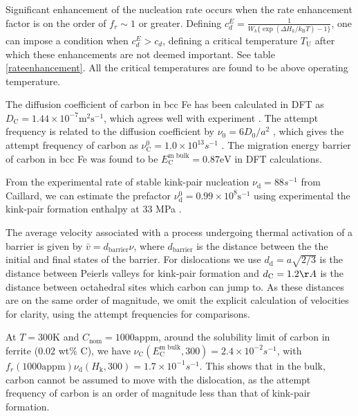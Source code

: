 \documentclass[a4paper,11pt]{article}
\numberwithin{equation}{chapter}
\numberwithin{listing}{chapter}
\begin{document}
Significant enhancement of the nucleation rate occurs when the rate enhancement factor
is on the order of \(f_r \sim 1\) or greater. Defining \(c_d^E = \frac{1}{W_k \{\exp(
   \Delta H_{k}/k_{\text{B}}T ) - 1 \}}\), one can impose a condition when \(c_d^E > c_d\),
defining a critical temperature \(T_{\text{U}}\) after which these enhancements are not
deemed important. See table \ref{rateenhancement}. All the critical temperatures
are found to be above operating temperature.





The diffusion coefficient of carbon in bcc Fe has been calculated in DFT as
\(D_{\text{C}} = 1.44 \times10^{-7} \text{m}^2\text{s}^{-1}\), which agrees well with
experiment \cite{Jiang2003,daSilva1976}. The attempt frequency is related to the
diffusion coefficient by \(\nu_0 = 6D_0 / a^2\) \cite{Ramasubramaniam2008}, which gives
the attempt frequency of carbon as \(\nu_{\text{C}}^0 = 1.0 \times10^{13} s^{-1}\)
\cite{Nematollahi2016}. The migration energy barrier of carbon in bcc Fe was found to be
\(E^{\text{m bulk}}_{\text{C}} = 0.87 \text{eV}\) in DFT calculations.

From the experimental rate of stable kink-pair nucleation \(\nu_{\text{d}} = 88 s^{-1}\)
from Caillard, we can estimate the prefactor \(\nu_{\text{d}}^0 = 0.99 \times
   10^8\text{s}^{-1}\) using experimental the kink-pair formation enthalpy at 33 MPa
\cite{itakura13_effec_hydrog_atoms_screw_disloc}.

The average velocity associated with a process undergoing thermal activation of a
barrier is given by \(\bar{v} = d_{\text{barrier}}\nu\), where \(d_{\text{barrier}}\) is
the distance between the the initial and final states of the barrier. For dislocations
we use \(d_{\text{d}} = a\sqrt{2/3}\) is the distance between Peierls valleys for
kink-pair formation and \(d_{\text{C}} = 1.2\AA\) is the distance between octahedral
sites which carbon can jump to. As these distances are on the same order of magnitude,
we omit the explicit calculation of velocities for clarity, using the attempt frequencies for comparisons.

At \(T=300 \text{K}\) and \(C_{\text{nom}} = 1000 \text{appm}\), around the solubility
limit of carbon in ferrite (0.02 wt\% C), we have \(\nu_{\text{C}}(E^{\text{m
   bulk}}_{\text{C}},300) = 2.4\times 10^{-2} s^{-1}\), with \(f_r(1000
   \text{appm})\nu_{\text{d}}(H_{\text{k}},300) = 1.7 \times 10^{-1} s^{-1}\). This shows
that in the bulk, carbon cannot be assumed to move with the dislocation, as the
attempt frequency of carbon is an order of magnitude less than that of kink-pair
formation.
\end{document}
